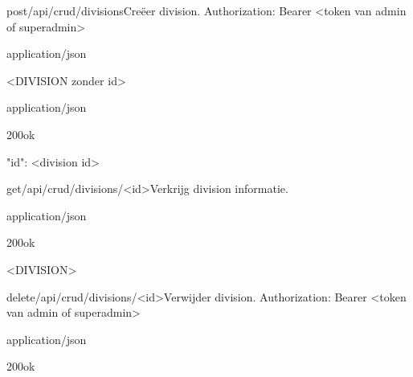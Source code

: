 \documentclass[10pt]{article}
\begin{document}
\begin{apiRoute}{post}{/api/crud/divisions}{Creëer division.}
 Authorization: Bearer <token van admin of superadmin>
	\begin{routeRequest}{application/json}
		\begin{routeRequestBody}
<DIVISION zonder id>
		\end{routeRequestBody}
	\end{routeRequest}

	\begin{routeResponse}{application/json}
		\begin{routeResponseItem}{200}{ok}
			\begin{routeResponseItemBody}
{
	"id": <division id>
}
			\end{routeResponseItemBody}
		\end{routeResponseItem}
	\end{routeResponse}
\end{apiRoute}

\begin{apiRoute}{get}{/api/crud/divisions/<id>}{Verkrijg division informatie.}
	\begin{routeParameter}
	\end{routeParameter}

	\begin{routeResponse}{application/json}
		\begin{routeResponseItem}{200}{ok}
			\begin{routeResponseItemBody}
<DIVISION>
			\end{routeResponseItemBody}
		\end{routeResponseItem}
	\end{routeResponse}
\end{apiRoute}

\begin{apiRoute}{delete}{/api/crud/divisions/<id>}{Verwijder division.}
 Authorization: Bearer <token van admin of superadmin>
	\begin{routeParameter}
		\routeParamItem{id}{division id}
	\end{routeParameter}

	\begin{routeResponse}{application/json}
		\begin{routeResponseItem}{200}{ok}
			\begin{routeResponseItemBody}
			\end{routeResponseItemBody}
		\end{routeResponseItem}
	\end{routeResponse}
\end{apiRoute}
\end{document}
